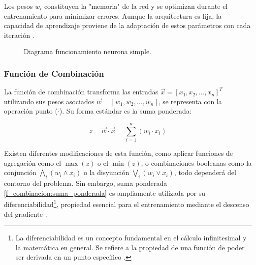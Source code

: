 Los pesos $w_i$ constituyen la "memoria" de la red y se optimizan durante el entrenamiento para minimizar errores. Aunque la arquitectura es fija, la capacidad de aprendizaje proviene de la adaptación de estos parámetros con cada iteración \cite{dl_python__chollet_2021}.

\begin{figure}[h]
	\centering
	\caption{Diagrama funcionamiento neurona simple.}
	\label{fig:diagrama_neurona_simple}
\end{figure}

\subsubsection{Función de Combinación}\label{f_combinacion}

La función de combinación transforma las entradas $\vec{x} = \left [ x_1, x_2, ..., x_n\right ]^T$ utilizando sus pesos asociados $\vec{w} =  \left [ w_1, w_2, ..., w_n\right ]$, se representa con la operación punto ($\cdot$). Su forma estándar es la suma ponderada:

\begin{equation}\label{f_combinacion:suma_ponderada}
z = \vec{w}\cdot\vec{x} = \sum_{i=1}^{n}(w_i \cdot x_i)
\end{equation}

Existen diferentes modificaciones de esta función, como aplicar funciones de agregación como el $\max(z)$ o el $\min(z)$, o combinaciones booleanas como la conjunción $\bigwedge_i(w_i \wedge x_i)$ o la disyunción $\bigvee_i(w_i \vee x_i)$, todo dependerá del contorno del problema. Sin embargo, suma ponderada \eqref{f_combinacion:suma_ponderada} es ampliamente utilizada por su diferenciabilidad\footnote{La diferenciabilidad es un concepto fundamental en el cálculo infinitesimal y la matemática en general. Se refiere a la propiedad de una función de poder ser derivada en un punto específico \cite{analisis_matematico__gordon_1995}.}, propiedad esencial para el entrenamiento mediante el descenso del gradiente \cite{dl_python__chollet_2021}.

